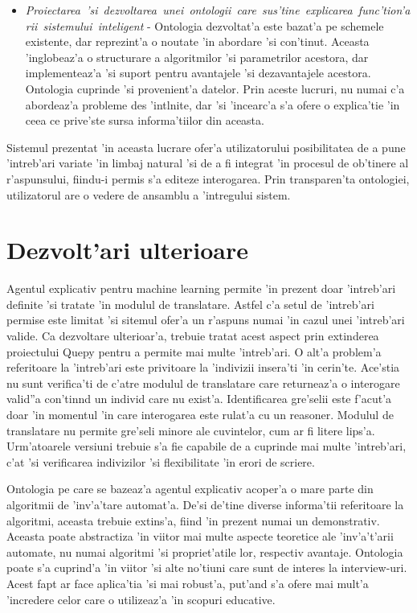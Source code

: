 \documentclass[12pt,a4paper,twoside]{report}
\begin{document}
\begin{itemize}
    \item {\it Proiectarea\ 'si\ dezvoltarea\ unei\ ontologii\ care\ sus'tine\ explicarea\ func'tion'arii\ sistemului\ inteligent} -  Ontologia dezvoltat'a este bazat'a pe schemele existente, dar reprezint'a o noutate 'in abordare 'si con'tinut. Aceasta 'inglobeaz'a o structurare a algoritmilor 'si parametrilor acestora, dar implementeaz'a 'si suport pentru avantajele 'si dezavantajele acestora. Ontologia cuprinde 'si provenient'a datelor. Prin aceste lucruri, nu numai c'a abordeaz'a probleme des 'int\ia lnite, dar 'si 'incearc'a s'a ofere o explica'tie 'in ceea ce prive'ste sursa informa'tiilor din aceasta.
\end{itemize}

Sistemul prezentat 'in aceasta lucrare ofer'a utilizatorului posibilitatea de a pune 'intreb'ari variate 'in limbaj natural 'si de a fi integrat 'in procesul de ob'tinere al r'aspunsului, fiindu-i permis s'a editeze interogarea. Prin transparen'ta ontologiei, utilizatorul are o vedere de ansamblu a 'intregului sistem.
\section{Dezvolt'ari ulterioare}

Agentul explicativ pentru machine learning permite 'in prezent doar 'intreb'ari definite 'si tratate 'in modulul de translatare. Astfel c'a setul de 'intreb'ari permise este limitat 'si sitemul ofer'a un r'aspuns numai 'in cazul unei 'intreb'ari valide. Ca dezvoltare ulterioar'a, trebuie tratat acest aspect prin extinderea proiectului Quepy pentru a permite mai multe 'intreb'ari. O alt'a problem'a referitoare la 'intreb'ari este privitoare la 'indivizii insera'ti 'in cerin'te. Ace'stia nu sunt verifica'ti de c'atre modulul de translatare care returneaz'a o interogare valid''a con'tin\ia nd un individ care nu exist'a. Identificarea gre'selii este f'acut'a doar 'in momentul 'in care interogarea este rulat'a cu un reasoner. Modulul de translatare nu permite gre'seli minore ale cuvintelor, cum ar fi litere lips'a. Urm'atoarele versiuni trebuie s'a fie capabile de a cuprinde mai multe 'intreb'ari, c'at 'si verificarea indivizilor 'si flexibilitate 'in erori de scriere.

Ontologia pe care se bazeaz'a agentul explicativ acoper'a o mare parte din algoritmii de 'inv'a'tare automat'a. De'si de'tine diverse informa'tii referitoare la algoritmi, aceasta trebuie extins'a, fiind 'in prezent numai un demonstrativ. Aceasta poate abstractiza 'in viitor mai multe aspecte teoretice ale 'inv'a't'arii automate, nu numai algoritmi 'si propriet'atile lor, respectiv avantaje. Ontologia poate s'a cuprind'a 'in viitor 'si alte no'tiuni care sunt de interes la interview-uri. Acest fapt ar face aplica'tia 'si mai robust'a, put'and s'a ofere mai mult'a 'incredere celor care o utilizeaz'a 'in scopuri educative.
\end{document}
